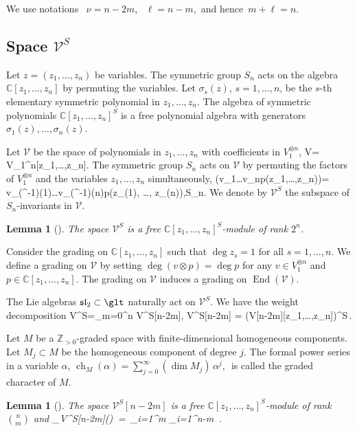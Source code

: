 \documentclass[12pt]{amsart}
\let\frak\mathfrak
\newtheorem{lem}[thm]{Lemma}
\numberwithin{equation}{section}
\theoremstyle{definition}
\let\mc\mathcal
\let\al\alpha
\let\si\sigma
\let\ox\otimes
\let\on\operatorname
\def\C{{\mathbb C}}
\def\Z{{\mathbb Z}}
\def\V{{\mc V}}
\def\End{\on{End}}
\def\ch{\on{ch}}
\def\slt{{\frak{sl}_2}}
\begin{document}
\smallskip
We use notations \
$\nu=n-2m$, \ $\ell = n-m$,\ and hence\ $ m+\ell=n$.


\subsection{Space $\V^{S}$} 
Let $z=(z_1,\dots,z_n)$ be variables. The symmetric group 
$S_n$  acts on the algebra $\C[z_1,\dots,z_n]$ by permuting the variables. Let $\si_s(z)$,
$s=1,\dots,n$, be the $s$-th elementary symmetric polynomial in $z_1,\dots, z_n$.
 The algebra of
symmetric polynomials $\C[z_1,\dots, z_n]^S$ is a free polynomial algebra with generators 
$\si_1(z),\dots,\si_n(z)$.

\smallskip


Let $\V$ be the space of polynomials in $z_1,\dots,z_n$ with coefficients
in $V_1^{\ox n}$,
\bea
\V = V_1^{\ox n}\ox \C[z_1,\dots,z_n].
\eea
The symmetric group $S_n$ acts on $\V$ by permuting the factors of $V_1^{\ox n}$
and the variables $z_1,\dots,z_n$ simultaneously,
\bea
\rho(v_1\ox\dots\ox v_n\ox p(z_1,\dots,z_n))=
v_{(\rho^{-1})(1)}\ox\dots\ox v_{(\rho^{-1})(n)}\ox p(z_{\rho(1)}, \dots, z_{\rho(n)}),\quad \rho\in S_n.
\eea
We denote by $\V^S$ the subspace of $S_n$-invariants in $\V$.

\begin{lem}
[\cite{MTV3}]
 The space $\V^S$ is a free $\C[z_1,\dots, z_n]^S$-module of rank $2^n$.
\end{lem}


Consider the grading on $\C[z_1,\dots,z_n]$
 such that $\deg z_s = 1$ for all $s = 1,\dots, n$. 
 We define a
grading on $\V$ by setting $\deg(v \ox p) = \deg p$ for any $v \in V_1^{\ox n}$ and 
$p\in\C[z_1,\dots,z_n]$. The
grading on $\V$ induces a  grading on $\End(\V)$.

\smallskip
The Lie algebras $\slt\subset\glt$ naturally act on $\V^S$. We have the weight decomposition
\bea
\V^S=\oplus_{m=0}^n \V^S[n-2m],
\qquad
\V^S[n-2m] = (V[n-2m]\ox\C[z_1,\dots,z_n])^{S}\,.
\eea


\smallskip
Let $M$ be a $\Z_{>0}$-graded space with finite-dimensional homogeneous components. Let
$M_j\subset M$ be the homogeneous component of degree $j$. The formal power series in a
variable $\al$,
$\ch_M(\al) =\sum_{j=0}^\infty (\dim M_j)\, \al^j,$\,
is called the graded character of $M$.

\begin{lem}
[\cite{MTV2}]
\label{lem frV}
The space $\V^S[n-2m]$  is a free $\C[z_1,\dots, z_n]^S$-module of rank $\binom{n}{m}$
and
\bean
\label{ch V}
\ch_{\V^S[n-2m]}(\al) \,=\, \prod_{i=1}^m \frac 1{1-\al^i} \cdot \prod_{i=1}^{n-m} \frac 1{1-\al^i}\,.
\eean
\end{lem}
\end{document}
